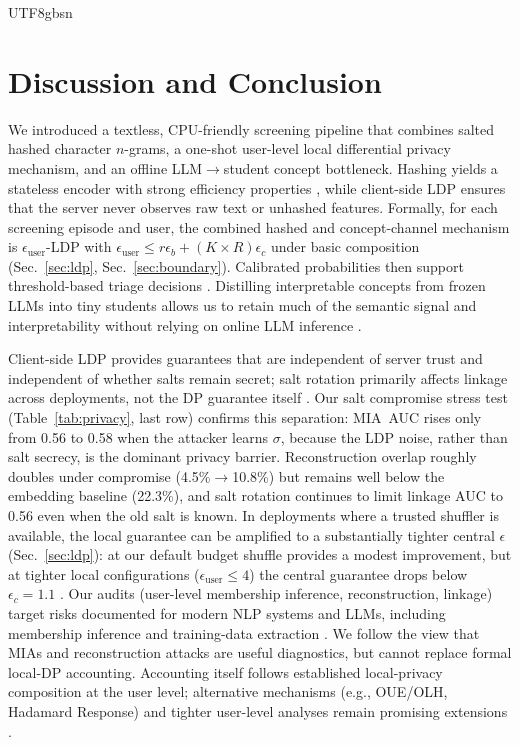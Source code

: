 \documentclass[lettersize,journal]{IEEEtran}
\begin{document}
\begin{CJK*}{UTF8}{gbsn}
\section{Discussion and Conclusion}
\label{sec:discussion}

We introduced a textless, CPU-friendly screening pipeline that combines salted hashed character $n$-grams, a one-shot user-level local differential privacy mechanism, and an offline LLM$\rightarrow$student concept bottleneck. Hashing yields a stateless encoder with strong efficiency properties \cite{weinberger2009featurehashing}, while client-side LDP ensures that the server never observes raw text or unhashed features. Formally, for each screening episode and user, the combined hashed and concept-channel mechanism is $\epsilon_{\text{user}}$-LDP with
$\epsilon_{\text{user}} \le r\epsilon_b + (K \times R)\epsilon_c$ under basic composition (Sec.~\ref{sec:ldp}, Sec.~\ref{sec:boundary}). Calibrated probabilities then support threshold-based triage decisions \cite{guo2017calibration,zadrozny2002calibration}. Distilling interpretable concepts from frozen LLMs into tiny students allows us to retain much of the semantic signal and interpretability without relying on online LLM inference \cite{koh2020concept,hinton2015distilling,demszky2020goemotions}.

Client-side LDP provides guarantees that are independent of server trust and independent of whether salts remain secret; salt rotation primarily affects linkage across deployments, not the DP guarantee itself \cite{apple2017privacy}. Our salt compromise stress test (Table~\ref{tab:privacy}, last row) confirms this separation: MIA~AUC rises only from 0.56 to 0.58 when the attacker learns $\sigma$, because the LDP noise, rather than salt secrecy, is the dominant privacy barrier. Reconstruction overlap roughly doubles under compromise (4.5\%$\to$10.8\%) but remains well below the embedding baseline (22.3\%), and salt rotation continues to limit linkage AUC to 0.56 even when the old salt is known. In deployments where a trusted shuffler is available, the local guarantee can be amplified to a substantially tighter central $\epsilon$ (Sec.~\ref{sec:ldp}): at our default budget shuffle provides a modest improvement, but at tighter local configurations ($\epsilon_{\text{user}} \le 4$) the central guarantee drops below $\epsilon_c{=}1.1$ \cite{balle2019shuffle,erlingsson2019shuffle}. Our audits (user-level membership inference, reconstruction, linkage) target risks documented for modern NLP systems and LLMs, including membership inference and training-data extraction \cite{shokri2017mia,carlini2021extracting}. We follow the view that MIAs and reconstruction attacks are useful diagnostics, but cannot replace formal local-DP accounting. Accounting itself follows established local-privacy composition at the user level; alternative mechanisms (e.g., OUE/OLH, Hadamard Response) and tighter user-level analyses remain promising extensions \cite{duchi2013localprivacy,kairouz2015composition,wang2017ldp,acharya2019hr,acharya2023userldp}.


\end{CJK*}
\end{document}
